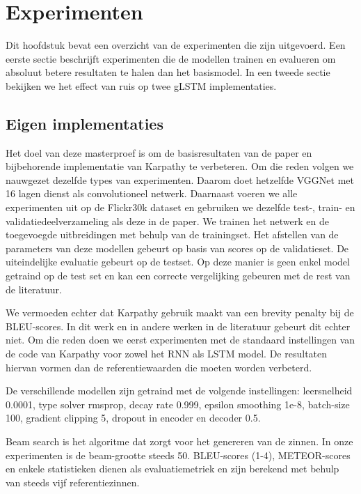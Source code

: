 \chapter{Experimenten} %
\label{cha:experimenten}
Dit hoofdstuk bevat een overzicht van de experimenten die zijn uitgevoerd. Een eerste sectie beschrijft experimenten die de modellen trainen en evalueren om absoluut betere resultaten te halen dan het basismodel. In een tweede sectie bekijken we het effect van ruis op twee gLSTM implementaties.

\section{Eigen implementaties} %
\label{sec:eigen_implementaties}
Het doel van deze masterproef is om de basisresultaten van de paper en bijbehorende implementatie van Karpathy\cite{Karpathy2015} te verbeteren. Om die reden volgen we nauwgezet dezelfde types van experimenten. Daarom doet hetzelfde VGGNet met 16 lagen dienst als convolutioneel netwerk. Daarnaast voeren we alle experimenten uit op de Flickr30k dataset en gebruiken we dezelfde test-, train- en validatiedeelverzameling als deze in de paper. We trainen het netwerk en de toegevoegde uitbreidingen met behulp van de trainingset. Het afstellen van de parameters van deze modellen gebeurt op basis van scores op de validatieset. De uiteindelijke evaluatie gebeurt op de testset. Op deze manier is geen enkel model getraind op de test set en kan een correcte vergelijking gebeuren met de rest van de literatuur.

We vermoeden echter dat Karpathy gebruik maakt van een brevity penalty  bij de BLEU-scores. In dit werk en in andere werken in de literatuur gebeurt dit echter niet. Om die reden doen we eerst experimenten met de standaard instellingen van de code van Karpathy voor zowel het RNN als LSTM model. De resultaten hiervan vormen dan de referentiewaarden die moeten worden verbeterd. 

De verschillende modellen zijn getraind met de volgende instellingen: leersnelheid 0.0001, type solver rmsprop, decay rate 0.999, epsilon smoothing 1e-8, batch-size 100, gradient clipping 5, dropout in encoder en decoder 0.5. 

Beam search is het algoritme dat zorgt voor het genereren van de zinnen. In onze experimenten is de beam-grootte steeds 50.
BLEU-scores (1-4), METEOR-scores en enkele statistieken dienen als evaluatiemetriek en zijn berekend met behulp van steeds vijf referentiezinnen.

